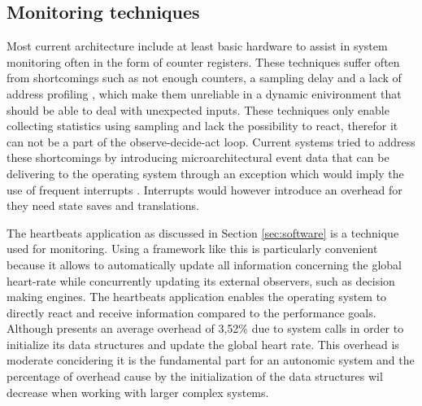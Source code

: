 \subsection{Monitoring techniques}
\label{sec:selfawareness}
Most current architecture include at least basic hardware to assist in system monitoring often in the form of counter registers. These techniques suffer often from shortcomings such as not enough counters, a sampling delay and a lack of address profiling \cite{reconfigurable}, which make them unreliable in a dynamic enivironment that should be able to deal with unexpected inputs. These techniques only enable collecting statistics using sampling and lack the possibility to react, therefor it can not be a part of the observe-decide-act loop. Current systems tried to address these shortcomings by introducing microarchitectural event data that can be delivering to the operating system through an exception which would imply the use of frequent interrupts \cite{reconfigurable}. Interrupts would however introduce an overhead for they need state saves and translations. 

The heartbeats application as discussed in Section \ref{sec:software} is a technique used for monitoring. Using a framework like this is particularly convenient because it allows to automatically update all information concerning the global heart-rate while concurrently updating its external observers, such as decision making engines. The heartbeats application enables the operating system to directly react and receive information compared to the performance goals. Although \cite{selfaware} presents an average overhead of 3,52\% due to system calls in order to initialize its data structures and update the global heart rate. This overhead is moderate concidering it is the fundamental part for an autonomic system and the percentage of overhead cause by the initialization of the data structures wil decrease when working with larger complex systems. 